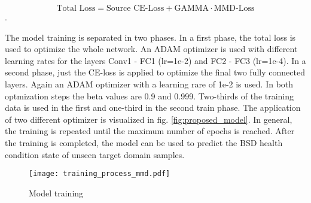 \begin{equation}
    \mbox{Total Loss} = \mbox{Source CE-Loss} + \mbox{GAMMA} \cdot \mbox{MMD-Loss}
\end{equation}.

The model training is separated in two phases. In a first phase, the total loss is used to optimize the whole network. An ADAM optimizer is used with different learning rates for the layers Conv1 - FC1 (lr=1e-2) and FC2 - FC3 (lr=1e-4). In a second phase, just the CE-loss is applied to optimize the final two fully connected layers. Again an ADAM optimizer with a learning rare of 1e-2 is used. In both optmization steps the beta values are 0.9 and 0.999. Two-thirds of the training data is used in the first and one-third in the second train phase. The application of two different optimizer is visualized in fig. \ref{fig:proposed_model}. In general, the training is repeated until the maximum number of epochs is reached. After the training is completed, the model can be used to predict the BSD health condition state of unseen target domain samples. 

\begin{figure}[H]
  \centering
  \texttt{[image: training\_process\_mmd.pdf]}
  \caption {Model training} \label{fig:Training_Process_MMD}
\end{figure}

